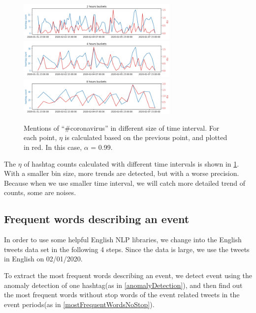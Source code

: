 \begin{figure}[h]
    \centering
    \includegraphics[width=0.7\textwidth]{images/coronavirus_2h.png}
    \includegraphics[width=0.7\textwidth]{images/coronavirus_4h.png}
    \includegraphics[width=0.7\textwidth]{images/coronavirus_8h.png}
    \caption{Mentions of “\#coronavirus” in different size of time interval. For each point, $\eta$ is calculated based on the previous point, and plotted in red. In this case, $\alpha$ = 0.99.}
    \label{fig:coronavirus_time_interval}
\end{figure}

The $\eta$ of hashtag counts calculated with different time intervals is shown in \ref{fig:coronavirus_time_interval}. With a smaller bin size, more trends are detected, but with a worse precision. Because when we use smaller time interval, we will catch more detailed trend of counts, some are noises. 

\subsection{Frequent words describing an event}

\label{frequentWordEvent}

In order to use some helpful English NLP libraries, we change into the English tweets data set in the following 4 steps. Since the data is large, we use the tweets in English on 02/01/2020. 

To extract the most frequent words describing an event, we detect event using the anomaly detection of one hashtag(as in \ref{anomalyDetection}), and then find out the most frequent words without stop words of the event related tweets in the event periods(as in \ref{mostFrequentWordsNoStop}).
\newpage


